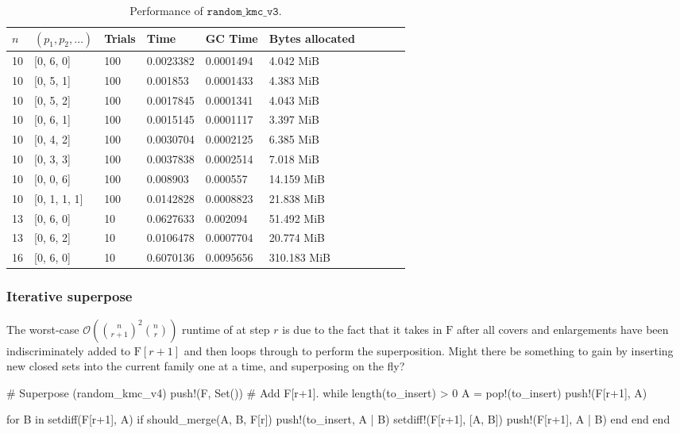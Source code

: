 \begin{table}[ht!]
  \centering
    \begin{tabular}{llllllllll}
      \toprule
      $n$ & $(p_1, p_2, \ldots)$ & Trials & Time  & GC Time & Bytes allocated \\
      \midrule
      10 & [0, 6, 0] & 100 & 0.0023382 & 0.0001494 & 4.042 MiB \\
      10 & [0, 5, 1] & 100 & 0.001853 & 0.0001433 & 4.383 MiB \\
      10 & [0, 5, 2] & 100 & 0.0017845 & 0.0001341 & 4.043 MiB \\
      10 & [0, 6, 1] & 100 & 0.0015145 & 0.0001117 & 3.397 MiB \\
      10 & [0, 4, 2] & 100 & 0.0030704 & 0.0002125 & 6.385 MiB \\
      10 & [0, 3, 3] & 100 & 0.0037838 & 0.0002514 & 7.018 MiB \\
      10 & [0, 0, 6] & 100 & 0.008903 & 0.000557 & 14.159 MiB \\
      10 & [0, 1, 1, 1] & 100 & 0.0142828 & 0.0008823 & 21.838 MiB \\
      13 & [0, 6, 0] & 10 & 0.0627633 & 0.002094 & 51.492 MiB \\
      13 & [0, 6, 2] & 10 & 0.0106478 & 0.0007704 & 20.774 MiB \\
      16 & [0, 6, 0] & 10 & 0.6070136 & 0.0095656 & 310.183 MiB \\
      \bottomrule
    \end{tabular}
  \caption{Performance of $\texttt{random\_kmc\_v3}$.}
  \label{tab:perf_v3}
\end{table}


\subsubsection{Iterative superpose}
The worst-case $\mathcal{O}({\binom{n}{r+1}}^2{\binom{n}{r}})$ runtime of  at step $r$ is due to the fact that it takes in $\mathrm{F}$ after all covers and enlargements have been indiscriminately added to $\mathrm{F}[r+1]$ and then loops through to perform the superposition. Might there be something to gain by inserting new closed sets into the current family one at a time, and superposing on the fly?

\begin{jllisting}
  # Superpose (random_kmc_v4)
  push!(F, Set()) # Add F[r+1].
  while length(to_insert) > 0
    A = pop!(to_insert)
    push!(F[r+1], A)

    for B in setdiff(F[r+1], A)
      if should_merge(A, B, F[r])
        push!(to_insert, A | B)
        setdiff!(F[r+1], [A, B])
        push!(F[r+1], A | B)
      end
    end
  end
\end{jllisting}

